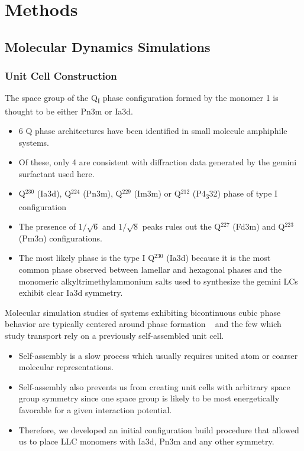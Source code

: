 \documentclass{article}
\begin{document}
  \section{Methods}

  \subsection{Molecular Dynamics Simulations}
  
  \subsubsection{Unit Cell Construction}\label{method:unit_cell}
  
  The space group of the Q\textsubscript{I} phase configuration formed by
  the monomer 1 is thought to be either Pn3m or Ia3d.
  \begin{itemize}
    \item 6 Q phase architectures have been identified in small molecule
    amphiphile systems.~\cite{mariani_cubic_1988}
    \item Of these, only 4 are consistent with diffraction data generated
    by the gemini surfactant used here.~\cite{pindzola_cross-linked_2003}
    \item Q$^{230}$ (Ia3d), Q$^{224}$ (Pn3m), Q$^{229}$ (Im3m) or Q$^{212}$ (P4\textsubscript{3}32) phase of type I configuration
    \item The presence of $1 / \sqrt{6}$ and $1 / \sqrt{8}$ peaks rules out the
    Q$^{227}$ (Fd3m) and Q$^{223}$ (Pm3n) configurations.
    \item The most likely phase is the type I Q$^{230}$ (Ia3d) because it is the
    most common phase observed between lamellar and hexagonal phases and the
    monomeric alkyltrimethylammonium salts used to synthesize the gemini LCs
    exhibit clear Ia3d symmetry. 
  \end{itemize}
  
  Molecular simulation studies of systems exhibiting bicontinuous cubic 
  phase behavior are typically centered around phase formation
  ~\cite{mondal_self-assembly_2013,ellison_entropy-driven_2006,gonzalez-segredo_coarsening_2004}
  and the few which study transport rely on a previously self-assembled unit cell.
  ~\cite{roy_water_2016}
  \begin{itemize}
    \item Self-assembly is a slow process which usually requires united atom
    or coarser molecular representations.~\cite{klein_large-scale_2008}
    \item Self-assembly also prevents us from creating unit cells with arbitrary
    space group symmetry since one space group is likely to be most energetically
    favorable for a given interaction potential.
    \item Therefore, we developed an initial configuration build procedure that allowed 
    us to place LLC monomers with Ia3d, Pn3m and any other symmetry. 
  \end{itemize}
  
\end{document}
